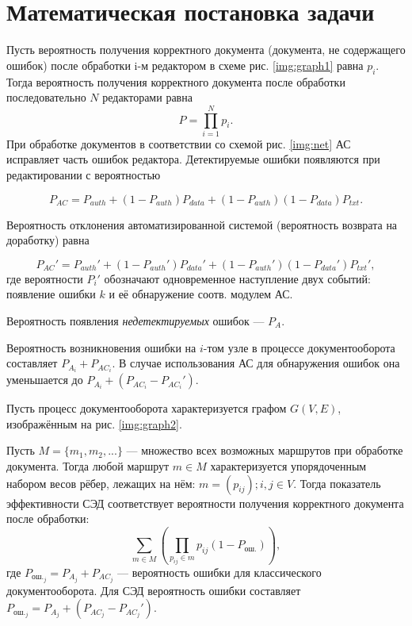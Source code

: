 \section{Математическая постановка задачи} \label{math}

Пусть вероятность получения корректного документа (документа, не содержащего ошибок) после обработки i-м редактором в схеме рис. \ref{img:graph1} равна $p_i$. Тогда вероятность получения корректного документа после обработки последовательно $N$ редакторами равна
$$
P=\prod_{i=1}^N p_i.
$$
При обработке документов в соответствии со схемой рис. \ref{img:net} АС исправляет часть ошибок редактора. Детектируемые ошибки появляются при редактировании с вероятностью

\begin{equation}
  \label{eq:equation3}
P_{AC}=P_{{auth}}+(1-P_{{auth}})P_{data}+(1-P_{{auth}})(1-P_{data})P_{txt}.
\end{equation}

Вероятность отклонения автоматизированной системой (вероятность возврата на доработку) равна

\begin{equation}
  \label{eq:equation4}
P_{AC}'=P_{{auth}}'+(1-P_{{auth}}')P_{data}'+(1-P_{{auth}}')(1-P_{data}')P_{txt}',
\end{equation}
где вероятности $P_i'$ обозначают одновременное наступление двух событий: появление ошибки $k$ и её обнаружение соотв. модулем АС.

\vspace{\baselineskip}
Вероятность появления \textit{недетектируемых} ошибок --- $P_A$.

\vspace{\baselineskip}
Вероятность возникновения ошибки на $i$-том узле в процессе документооборота составляет $P_{A_i}+P_{{AC}_i}$. В случае использования АС для обнаружения ошибок она уменьшается до $P_{A_i}+(P_{{AC}_i}-P_{{AC}_i}')$.

\vspace{\baselineskip}
Пусть процесс документооборота характеризуется графом $G(V,E)$, изображённым на рис. \ref{img:graph2}.

\vspace{\baselineskip}
Пусть $M = \{m_1, m_2, ... \}$ — множество всех возможных маршрутов при обработке документа. Тогда любой маршрут $m \in M$ характеризуется упорядоченным набором весов рёбер, лежащих на нём: $m=(p_{ij}); i,j \in V$. Тогда показатель эффективности СЭД соответствует вероятности получения корректного документа после обработки:
$$
\sum_{m \in M} (\prod_{p_{ij} \in m} p_{ij}(1-P_{\textrm{ош.}})),
$$
где $P_{{\textrm{ош.}}_j}=P_{A_j}+P_{{AC}_j}$ --- вероятность ошибки для классического документооборота. Для СЭД вероятность ошибки составляет $P_{{\textrm{ош.}}_j}=P_{A_j}+(P_{{AC}_j}-P_{{AC}_j}')$.

